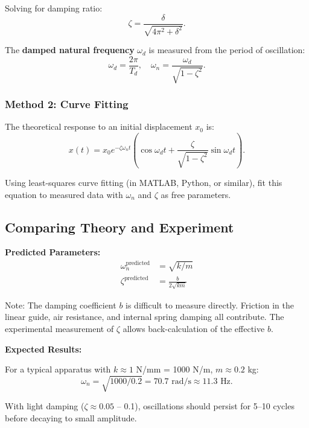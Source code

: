 Solving for damping ratio:
\begin{equation}
\zeta = \frac{\delta}{\sqrt{4\pi^2 + \delta^2}}.
\end{equation}

The \textbf{damped natural frequency} $\omega_d$ is measured from the period of oscillation:
\begin{equation}
\omega_d = \frac{2\pi}{T_d}, \quad \omega_n = \frac{\omega_d}{\sqrt{1-\zeta^2}}.
\end{equation}

\subsubsection{Method 2: Curve Fitting}

The theoretical response to an initial displacement $x_0$ is:
\begin{equation}
x(t) = x_0 e^{-\zeta\omega_n t}\left(\cos\omega_d t + \frac{\zeta}{\sqrt{1-\zeta^2}}\sin\omega_d t\right).
\end{equation}

Using least-squares curve fitting (in MATLAB, Python, or similar), fit this equation to measured data with $\omega_n$ and $\zeta$ as free parameters.

\subsection{Comparing Theory and Experiment}

\textbf{Predicted Parameters:}
\begin{align}
\omega_n^{\text{predicted}} &= \sqrt{k/m} \\
\zeta^{\text{predicted}} &= \frac{b}{2\sqrt{km}}
\end{align}

Note: The damping coefficient $b$ is difficult to measure directly. Friction in the linear guide, air resistance, and internal spring damping all contribute. The experimental measurement of $\zeta$ allows back-calculation of the effective $b$.

\textbf{Expected Results:}

For a typical apparatus with $k \approx 1$ N/mm = 1000 N/m, $m \approx 0.2$ kg:
\begin{equation}
\omega_n = \sqrt{1000/0.2} = 70.7 \text{ rad/s} \approx 11.3 \text{ Hz}.
\end{equation}

With light damping ($\zeta \approx 0.05$ -- 0.1), oscillations should persist for 5--10 cycles before decaying to small amplitude.

